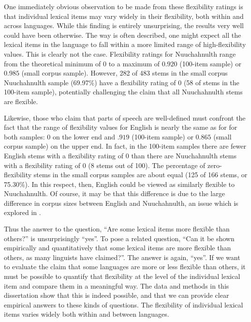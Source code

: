 One immediately obvious observation to be made from these flexibility ratings is that individual lexical items may vary widely in their flexibility, both within and across languages. While this finding is entirely unsurprising, the results very well could have been otherwise. The way  is often described, one might expect all the lexical items in the language to fall within a more limited range of high-flexibility values. This is clearly not the case. Flexibility ratings for Nuuchahnulth range from the theoretical minimum of $0$ to a maximum of $0.920$ (100-item sample) or $0.985$ (small corpus sample). However, 282 of 483 stems in the small corpus Nuuchahnulth sample (69.97\%) have a flexibility rating of $0$ (58 of stems in the 100-item sample), potentially challenging the claim that all Nuuchahnulth stems are flexible.

Likewise, those who claim that  parts of speech are well-defined must confront the fact that the range of flexibility values for English is nearly the same as for  for both samples: $0$ on the lower end and $.919$ (100-item sample) or $0.865$ (small corpus sample) on the upper end. In fact, in the 100-item samples there are fewer English stems with a flexibility rating of $0$ than there are Nuuchahnulth stems with a flexibility rating of $0$ (8 stems out of 100). The percentage of zero-flexibility stems in the small corpus samples are about equal (125 of 166 stems, or 75.30\%). In this respect, then, English could be viewed as similarly flexible to Nuuchahnulth. Of course, it may be that this difference is due to the large difference in corpus sizes between English and Nuuchahnulth, an issue which is explored in .

Thus the answer to the question, \enquote{Are some lexical items more flexible than others?} is unsurprisingly \enquote{yes}. To pose a related question, \enquote{Can it be shown empirically and quantitatively that some lexical items are more flexible than others, as many linguists have claimed?}. The answer is again, \enquote{yes}. If we want to evaluate the claim that some languages are more or less flexible than others, it must be possible to quantify that flexibility at the level of the individual lexical item and compare them in a meaningful way. The data and methods in this dissertation show that this is indeed possible, and that we can provide clear empirical answers to these kinds of questions. The flexibility of individual lexical items varies widely both within and between languages.

